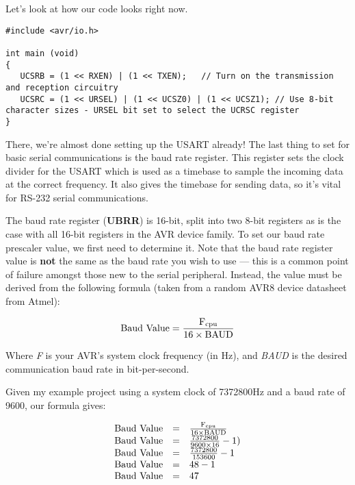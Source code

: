 \documentclass[a4paper,oneside,notitlepage]{book}
\begin{document}
Let's look at how our code looks right now.

\begin{center}
\begin{lstlisting}
#include <avr/io.h>

int main (void)
{
   UCSRB = (1 << RXEN) | (1 << TXEN);   // Turn on the transmission and reception circuitry
   UCSRC = (1 << URSEL) | (1 << UCSZ0) | (1 << UCSZ1); // Use 8-bit character sizes - URSEL bit set to select the UCRSC register
}
\end{lstlisting}
\end{center}

There, we're almost done setting up the USART already! The last thing to set for basic serial communications is the baud rate register. This register sets the clock divider for the USART which is used as a timebase to sample the incoming data at the correct frequency. It also gives the timebase for sending data, so it's vital for RS-232 serial communications.

The baud rate register (\textbf{UBRR}) is 16-bit, split into two 8-bit registers as is the case with all 16-bit registers in the AVR device family. To set our baud rate prescaler value, we first need to determine it. Note that the baud rate register value is \textbf{not} the same as the baud rate you wish to use --- this is a common point of failure amongst those new to the serial peripheral. Instead, the value must be derived from the following formula (taken from a random AVR8 device datasheet from Atmel):

\begin{displaymath}
    \text{Baud Value} = \frac{ \text{F\ensuremath{_{\textrm{cpu}}}} }{ 16 \times \text{BAUD} }
\end{displaymath}

Where \emph{F} is your AVR's system clock frequency (in Hz), and \emph{BAUD} is the desired communication baud rate in bit-per-second.

Given my example project using a system clock of 7372800Hz and a baud rate of 9600, our formula gives:

\begin{displaymath}
\begin{array}{rcl}
    \text{Baud Value} & = & \frac{ \text{F\ensuremath{_{\textrm{cpu}}}} }{ 16 \times \text{BAUD} } \\
    \text{Baud Value} & = & \frac{ 7372800 } { 9600 \times 16 } - 1) \\
    \text{Baud Value} & = & \frac{ 7372800 } { 153600 } - 1 \\
    \text{Baud Value} & = & 48 - 1 \\
    \text{Baud Value} & = & 47 \\
\end{array}
\end{displaymath}
\end{document}
